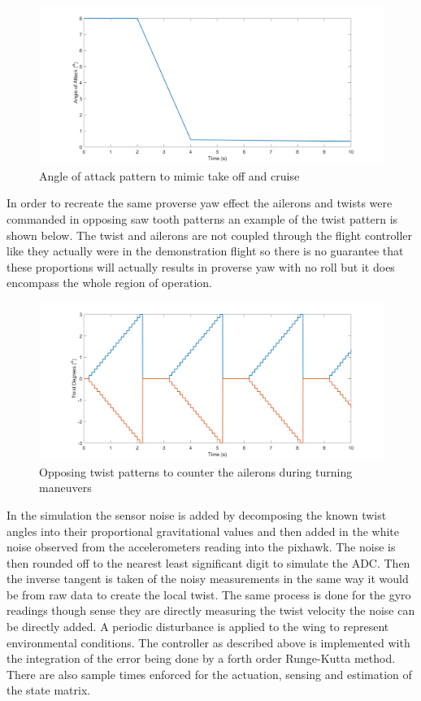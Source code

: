 \documentclass[11pt]{ucthesis}
\begin{document}
\begin{figure}[thpb]
\centering
\includegraphics[width=1\linewidth]{Figures/ProverseYawAoA.png}
\caption{Angle of attack pattern to mimic take off and cruise}
\label{fig:AOAPat}
\end{figure}

In order to recreate the same proverse yaw effect the ailerons and twists were commanded in opposing saw tooth patterns an example of the twist pattern is shown below. The twist and ailerons are not coupled through the flight controller like they actually were in the demonstration flight so there is no guarantee that these proportions will actually results in proverse yaw with no roll but it does encompass the whole region of operation. 

\begin{figure}[thpb]
\centering
\includegraphics[width=1\linewidth]{Figures/ProverseYawTwist.png}
\caption{Opposing twist patterns to counter the ailerons during turning maneuvers}
\label{fig:APTwist}
\end{figure}

In the simulation the sensor noise is added by decomposing the known twist angles into their proportional gravitational values and then added in the white noise observed from the accelerometers reading into the pixhawk. The noise is then rounded off to the nearest least significant digit to simulate the ADC. Then the inverse tangent is taken of the noisy measurements in the same way it would be from raw data to create the local twist. The same process is done for the gyro readings though sense they are directly measuring the twist velocity the noise can be directly added. A periodic disturbance is applied to the wing to represent environmental conditions. The controller as described above is implemented with the integration of the error being done by a forth order Runge-Kutta method. There are also sample times enforced for the actuation, sensing and estimation of the state matrix.
\end{document}
